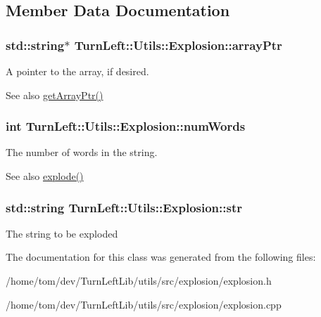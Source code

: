 \subsection{Member Data Documentation}
\hypertarget{classTurnLeft_1_1Utils_1_1Explosion_a56af88f749fdb6c519241f887caa03fa}{
\subsubsection[{arrayPtr}]{\setlength{\rightskip}{0pt plus 5cm}std::string$\ast$ {\bf TurnLeft::Utils::Explosion::arrayPtr}}}
\label{classTurnLeft_1_1Utils_1_1Explosion_a56af88f749fdb6c519241f887caa03fa}
A pointer to the array, if desired. \begin{DoxySeeAlso}{See also}
\hyperlink{classTurnLeft_1_1Utils_1_1Explosion_ac0bb44dc711f42ae5b3ccd48ae41d562}{getArrayPtr()} 
\end{DoxySeeAlso}
\hypertarget{classTurnLeft_1_1Utils_1_1Explosion_a918953ec29dc35a398bbf85bf0db5c8d}{
\subsubsection[{numWords}]{\setlength{\rightskip}{0pt plus 5cm}int {\bf TurnLeft::Utils::Explosion::numWords}}}
\label{classTurnLeft_1_1Utils_1_1Explosion_a918953ec29dc35a398bbf85bf0db5c8d}
The number of words in the string. \begin{DoxySeeAlso}{See also}
\hyperlink{classTurnLeft_1_1Utils_1_1Explosion_ac517370d7a669bed21806f93211f588a}{explode()} 
\end{DoxySeeAlso}
\hypertarget{classTurnLeft_1_1Utils_1_1Explosion_ab45811e6b3a745ff8bf0bc0685820348}{
\subsubsection[{str}]{\setlength{\rightskip}{0pt plus 5cm}std::string {\bf TurnLeft::Utils::Explosion::str}}}
\label{classTurnLeft_1_1Utils_1_1Explosion_ab45811e6b3a745ff8bf0bc0685820348}
The string to be exploded 

The documentation for this class was generated from the following files:\begin{DoxyCompactItemize}
\item 
/home/tom/dev/TurnLeftLib/utils/src/explosion/explosion.h\item 
/home/tom/dev/TurnLeftLib/utils/src/explosion/explosion.cpp\end{DoxyCompactItemize}

